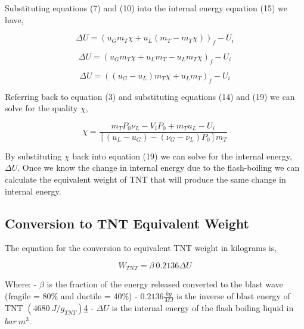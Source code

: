 \documentclass[10pt,parskip=half,
toc=sectionentrywithdots,
bibliography=totocnumbered,
captions=tableheading,numbers=noendperiod]{scrartcl}
\begin{document}
Substituting equations (7) and (10) into the internal energy equation
(15) we have,

\begin{equation}\Delta U = \left(u_Gm_T\chi + u_L(m_T - m_T \chi)\right)_f - U_i\end{equation}

\begin{equation}\Delta U = \left( u_G m_T \chi + u_L m_T - u_L m_T \chi \right)_f - U_i\end{equation}

\begin{equation}\Delta U = \left( \left(u_G - u_L \right) m_T \chi + u_L m_T \right)_f - U_i\end{equation}

Referring back to equation (3) and substituting equations (14) and (19)
we can solve for the quality \(\chi\),

\begin{equation}\chi = \frac{m_TP_0\nu_L-V_iP_0+m_Tu_L-U_i}{\left[(u_L-u_G)-(\nu_G-\nu_L)P_0 \right]m_T}\end{equation}

By substituting \(\chi\) back into equation (19) we can solve for the
internal energy, \(\Delta U\). Once we know the change in internal
energy due to the flash-boiling we can calculate the equivalent weight
of TNT that will produce the same change in internal energy.

\hypertarget{conversion-to-tnt-equivalent-weight}{%
\subsection{Conversion to TNT Equivalent
Weight}\label{conversion-to-tnt-equivalent-weight}}

The equation for the conversion to equivalent TNT weight in kilograms
is,

\begin{equation}W_{TNT} = \beta\: 0.2136 \Delta U\end{equation}

Where: - \(\beta\) is the fraction of the energy released converted to
the blast wave (fragile = 80\% and ductile = 40\%) -
\(0.2136\frac{kg}{MJ}\) is the inverse of blast energy of TNT
\(\left(4680\:J/g_{TNT}\right)\)\href{https://books.google.com/books?id=Id15BgAAQBAJ\&pg=PA2\&lpg=PA2\&dq=tnt+4680+J/g\&source=bl\&ots=qx-7s6EAHa\&sig=ACfU3U1wcca5cWLX38lBoxDvvRqH0uaZ5g\&hl=en\&sa=X\&ved=2ahUKEwiN2cDP1pHjAhWnm-AKHfBYCGkQ6AEwAHoECAkQAQ\#v=onepage\&q=tnt\%204680\%20J\%2Fg\&f=false}{4}
- \(\Delta U\) is the internal energy of the flash boiling liquid in
\(bar\:m^3\).
\end{document}
